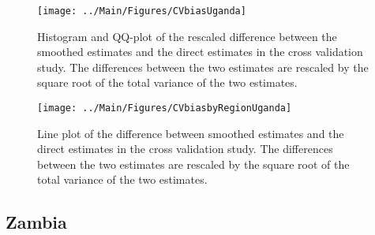 \documentclass[12pt]{article}\usepackage[]{graphicx}\usepackage[]{color}
\newenvironment{knitrout}{}{} %
\begin{document}
\begin{knitrout}
\color{fgcolor}\begin{figure}[bht]

{\centering \texttt{[image: ../Main/Figures/CVbiasUganda]} 

}

\caption[Histogram and QQ-plot of the rescaled difference between the smoothed estimates and the direct estimates in the cross validation study]{Histogram and QQ-plot of the rescaled difference between the smoothed estimates and the direct estimates in the cross validation study. The differences between the two estimates are rescaled by the square root of the total variance of the two estimates.}\label{fig:unnamed-chunk-329}
\end{figure}


\end{knitrout}

\begin{knitrout}
\color{fgcolor}\begin{figure}[bht]

{\centering \texttt{[image: ../Main/Figures/CVbiasbyRegionUganda]} 

}

\caption[Line plot of the difference between smoothed estimates and the direct estimates in the cross validation study]{Line plot of the difference between smoothed estimates and the direct estimates in the cross validation study. The differences between the two estimates are rescaled by the square root of the total variance of the two estimates.}\label{fig:unnamed-chunk-330}
\end{figure}


\end{knitrout}



\clearpage
\subsection{Zambia}


\end{document}
